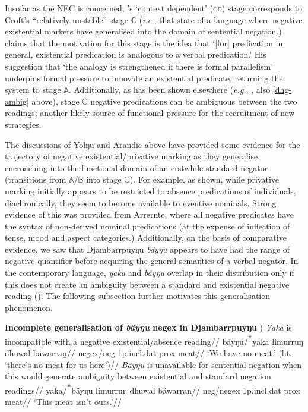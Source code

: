 Insofar as the \acrshort{NEC} is concerned, \citeauthor{Deo2015a}'s `context dependent' (\textsc{cd}) stage corresponds to Croft's ``relatively unstable'' stage $ \mathbb C $ (\textit{i.e.}, that state of a language where negative existential markers have generalised into the domain of sentential negation.) \citet[19]{Croft1991} claims that the motivation for this stage is the idea that `[for] predication in general, existential predication is analogous to a verbal predication.' His suggestion that `the analogy is strengthened if there is formal parallelism' underpins formal pressure to innovate an existential predicate, returning the system to stage $ \mathbb A $. Additionally, as has been shown elsewhere (\textit{e.g.}, \nextx, also \ref{dhg-ambig} above), stage $ \mathbb C $ negative predications can be ambiguous between the two readings; another likely source of functional pressure for the recruitment of new strategies.

The discussions of Yolŋu and Arandic above have provided some evidence for the trajectory of negative existential/privative marking as they generalise, encroaching into the functional domain of an erstwhile standard negator (transitions from $\mathbb{A/B}$ into stage $\mathbb C$). For example, as shown, while privative marking initially appears to be restricted to absence predications of individuals, diachronically, they seem to become available to eventive nominals. Strong evidence of this was provided from Arrernte, where all negative predicates have the syntax of non-derived nominal predications (at the expense of inflection of tense, mood and aspect categories.) Additionally, on the basis of comparative evidence, we saw that Djambarrpuyŋu \textit{bäyŋu} appears to have had the range of negative quantifier before acquiring the general semantics of a verbal negator. In the contemporary language, \textit{yaka} and \textit{bäyŋu} overlap in their distribution only if this does not create an ambiguity between a standard and existential negative reading (\nextx). The following subsection further motivates this generalisation phenomenon. 


\pex \textbf{Incomplete generalisation of \textit{bäyŋu} \gls{negex} in Djambarrpuyŋu} )
\a\begingl\glpreamble\textit{Yaka} is incompatible with a negative existential/absence reading//
\gla bäyŋu/\textsuperscript{$ ^\# $}yaka  limurruŋ dhuwal bäwarraṉ//
\glb \gls{negex}/\gls{neg} 1p.\gls{incl}.\gls{dat} \gls{prox} meat//
\glft `We have no meat.' (lit. `there's no meat for us here')//\endgl
\a\begingl\glpreamble \textit{Bäyŋu} is unavailable for sentential negation when this would generate ambiguity between existential and standard negation readings//
\gla yaka/\textsuperscript{$ ^\# $}bäyŋu limurruŋ dhuwal bäwarraṉ//
\glb  \gls{neg}/\gls{negex}  1p.\gls{incl}.\gls{dat} \gls{prox} meat//
\glft`This meat isn't ours.'//\endgl
\xe

